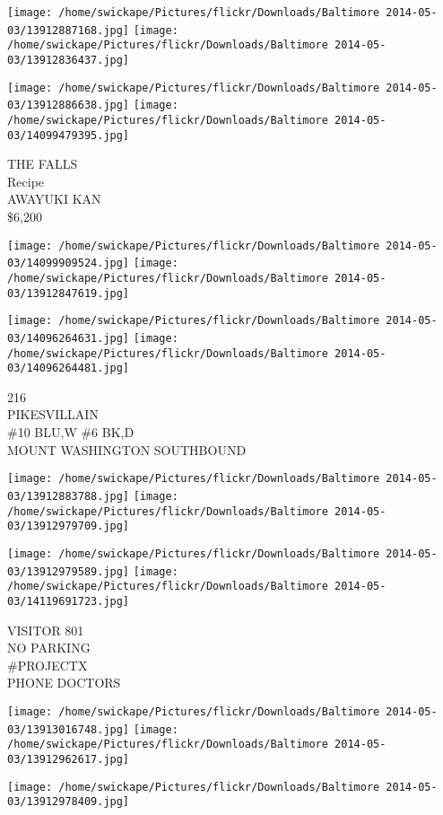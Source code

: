 \documentclass[10pt,letterpaper]{article}
\begin{document}
\texttt{[image: /home/swickape/Pictures/flickr/Downloads/Baltimore 2014-05-03/13912887168.jpg]}
\texttt{[image: /home/swickape/Pictures/flickr/Downloads/Baltimore 2014-05-03/13912836437.jpg]}

\texttt{[image: /home/swickape/Pictures/flickr/Downloads/Baltimore 2014-05-03/13912886638.jpg]}
\texttt{[image: /home/swickape/Pictures/flickr/Downloads/Baltimore 2014-05-03/14099479395.jpg]}

THE FALLS\\
Recipe\\
AWAYUKI KAN\\
\$6,200
\pagebreak

\texttt{[image: /home/swickape/Pictures/flickr/Downloads/Baltimore 2014-05-03/14099909524.jpg]}
\texttt{[image: /home/swickape/Pictures/flickr/Downloads/Baltimore 2014-05-03/13912847619.jpg]}

\texttt{[image: /home/swickape/Pictures/flickr/Downloads/Baltimore 2014-05-03/14096264631.jpg]}
\texttt{[image: /home/swickape/Pictures/flickr/Downloads/Baltimore 2014-05-03/14096264481.jpg]}

216\\
PIKESVILLAIN\\
\#10 BLU,W \#6 BK,D\\
MOUNT WASHINGTON SOUTHBOUND
\pagebreak

\texttt{[image: /home/swickape/Pictures/flickr/Downloads/Baltimore 2014-05-03/13912883788.jpg]}
\texttt{[image: /home/swickape/Pictures/flickr/Downloads/Baltimore 2014-05-03/13912979709.jpg]}

\texttt{[image: /home/swickape/Pictures/flickr/Downloads/Baltimore 2014-05-03/13912979589.jpg]}
\texttt{[image: /home/swickape/Pictures/flickr/Downloads/Baltimore 2014-05-03/14119691723.jpg]}

VISITOR 801\\
NO PARKING\\
\#PROJECTX\\
PHONE DOCTORS
\pagebreak

\texttt{[image: /home/swickape/Pictures/flickr/Downloads/Baltimore 2014-05-03/13913016748.jpg]}
\texttt{[image: /home/swickape/Pictures/flickr/Downloads/Baltimore 2014-05-03/13912962617.jpg]}

\vspace{0.25in}
\texttt{[image: /home/swickape/Pictures/flickr/Downloads/Baltimore 2014-05-03/13912978409.jpg]}
\end{document}
